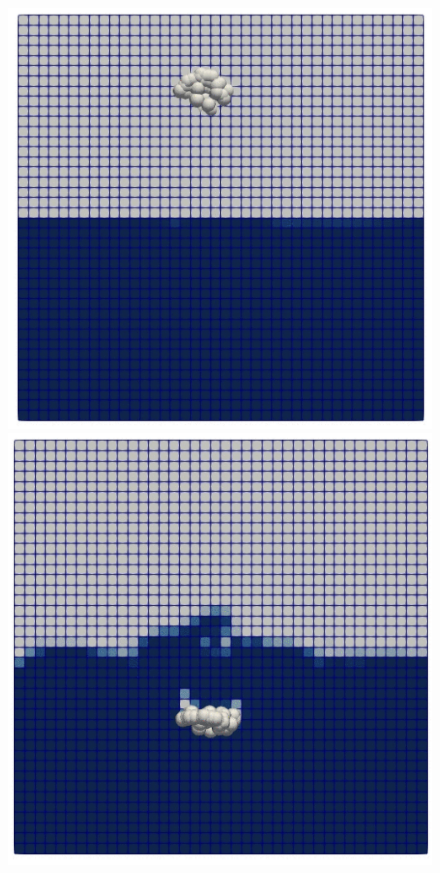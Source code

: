 \begin{figure}[!ht]
    \centering
    \begin{minipage}{.5\textwidth}
        \centering
        \includegraphics[width=\linewidth]{GWU_Thesis_Sarmakeeva/Images/chap4/clump_1.png}
    \end{minipage}%
    \begin{minipage}{.5\textwidth}
        \centering
        \includegraphics[width=\linewidth]{GWU_Thesis_Sarmakeeva/Images/chap4/clump_2.png}

\end{minipage}
\end{figure}
